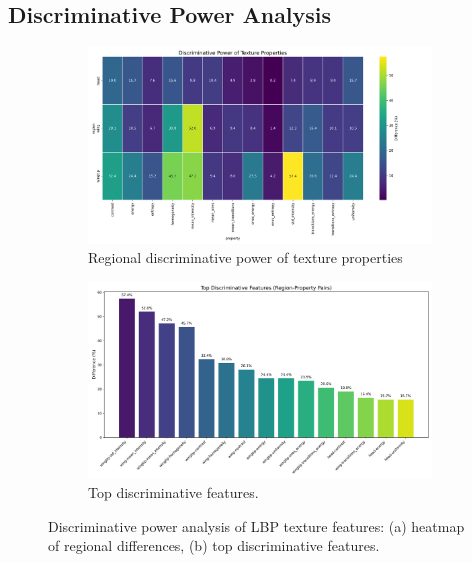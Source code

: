 \documentclass[a4paper,12pt]{report}
\begin{document}
\subsection{Discriminative Power Analysis}
\begin{figure}[H]
    \centering
    \begin{subfigure}[b]{0.48\textwidth}
        \centering
        \includegraphics[width=\textwidth]{images/LBP/discriminative_power_heatmap.png}
        \caption{Regional discriminative power of texture properties}
        \label{fig:heatmap}
    \end{subfigure}
    \hfill
    \begin{subfigure}[b]{0.48\textwidth}
        \centering
        \includegraphics[width=\textwidth]{images/LBP/top_discriminative_features.png}
        \caption{Top discriminative features.}
        \label{fig:top_features}
    \end{subfigure}
    \caption{Discriminative power analysis of LBP texture features: (a) heatmap of regional differences, (b) top discriminative features.}
    \label{fig:lbp_discriminative_power}
\end{figure}
\end{document}

